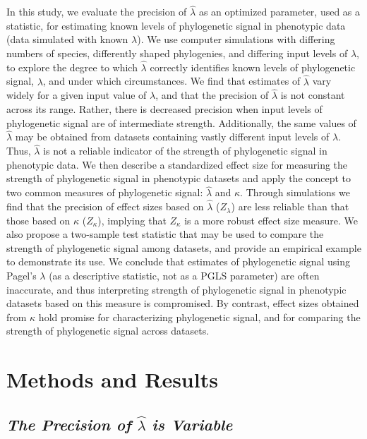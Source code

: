 \documentclass[]{article}
\begin{document}
In this study, we evaluate the precision of \(\hat{\lambda}\) as an
optimized parameter, used as a statistic, for estimating known levels of
phylogenetic signal in phenotypic data (data simulated with known
\(\lambda\)). We use computer simulations with differing numbers of
species, differently shaped phylogenies, and differing input levels of
\(\lambda\), to explore the degree to which \(\hat{\lambda}\) correctly
identifies known levels of phylogenetic signal, \(\lambda\), and under
which circumstances. We find that estimates of \(\hat{\lambda}\) vary
widely for a given input value of \(\lambda\), and that the precision of
\(\hat{\lambda}\) is not constant across its range. Rather, there is
decreased precision when input levels of phylogenetic signal are of
intermediate strength. Additionally, the same values of
\(\hat{\lambda}\) may be obtained from datasets containing vastly
different input levels of \(\lambda\). Thus, \(\hat{\lambda}\) is not a
reliable indicator of the strength of phylogenetic signal in phenotypic
data. We then describe a standardized effect size for measuring the
strength of phylogenetic signal in phenotypic datasets and apply the
concept to two common measures of phylogenetic signal: \(\hat{\lambda}\)
and \(\kappa\). Through simulations we find that the precision of effect
sizes based on \(\hat{\lambda}\) (\(Z_{\lambda}\)) are less reliable
than that those based on \(\kappa\) (\(Z_\kappa\)), implying that
\(Z_\kappa\) is a more robust effect size measure. We also propose a
two-sample test statistic that may be used to compare the strength of
phylogenetic signal among datasets, and provide an empirical example to
demonstrate its use. We conclude that estimates of phylogenetic signal
using Pagel's \(\lambda\) (as a descriptive statistic, not as a PGLS
parameter) are often inaccurate, and thus interpreting strength of
phylogenetic signal in phenotypic datasets based on this measure is
compromised. By contrast, effect sizes obtained from \(\kappa\) hold
promise for characterizing phylogenetic signal, and for comparing the
strength of phylogenetic signal across datasets.

\hypertarget{methods-and-results}{%
\section{Methods and Results}\label{methods-and-results}}

\hypertarget{the-precision-of-hatlambda-is-variable}{%
\subsection{\texorpdfstring{\emph{The Precision of \(\hat{\lambda}\) is
Variable}}{The Precision of \textbackslash{}hat\{\textbackslash{}lambda\} is Variable}}\label{the-precision-of-hatlambda-is-variable}}
\end{document}
